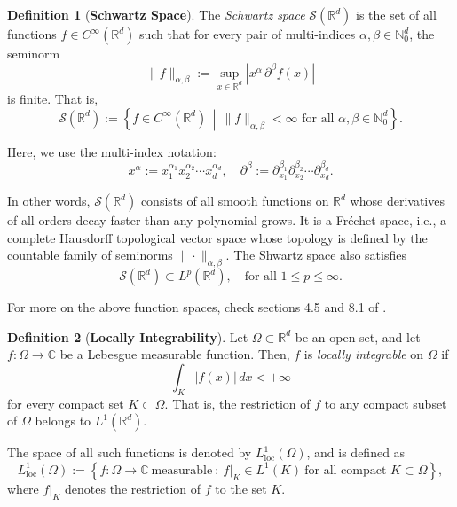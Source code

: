\documentclass[12pt,a4paper]{report}
\theoremstyle{definition}
\newtheorem{definition}{Definition}
\begin{document}
\begin{definition}[\textbf{Schwartz Space}] \label{def:schwartz}
The \textit{Schwartz space} \( \mathcal{S}(\mathbb{R}^d) \) is the set of all functions \( f \in C^\infty(\mathbb{R}^d) \) such that for every pair of multi-indices \( \alpha, \beta \in \mathbb{N}_0^d \), the seminorm
\[
\|f\|_{\alpha,\beta} := \sup_{x \in \mathbb{R}^d} |x^\alpha \, \partial^\beta f(x)|
\]
is finite. That is,
\[
\mathcal{S}(\mathbb{R}^d) := \left\{ f \in C^\infty(\mathbb{R}^d) \,\middle|\, \|f\|_{\alpha,\beta} < \infty \text{ for all } \alpha, \beta \in \mathbb{N}_0^d \right\}.
\]

Here, we use the multi-index notation:
\[
x^\alpha := x_1^{\alpha_1} x_2^{\alpha_2} \cdots x_d^{\alpha_d}, \quad \partial^\beta := \partial_{x_1}^{\beta_1} \partial_{x_2}^{\beta_2} \cdots \partial_{x_d}^{\beta_d}.
\]

In other words, \( \mathcal{S}(\mathbb{R}^d) \) consists of all smooth functions on \( \mathbb{R}^d \) whose derivatives of all orders decay faster than any polynomial grows. It is a Fréchet space, i.e., a complete Hausdorff topological vector space whose topology is defined by the countable family of seminorms \( \| \cdot \|_{\alpha, \beta} \). The Shwartz space also satisfies
\[
\mathcal{S}(\mathbb{R}^d) \subset L^p(\mathbb{R}^d), \quad \text{for all } 1 \le p \le \infty.
\]

For more on the above function spaces, check sections 4.5 and 8.1 of \cite{folland1999real}.
\end{definition}

\begin{definition}[\textbf{Locally Integrability}]
Let \( \Omega \subset \mathbb{R}^d \) be an open set, and let \\ \( f : \Omega \to \mathbb{C} \) be a Lebesgue measurable function. Then, \( f \) is \emph{locally integrable} on \( \Omega \) if
\[
\int_K |f(x)| \, dx < +\infty
\]
for every compact set \( K \subset \Omega \). That is, the restriction of \( f \) to any compact subset of \( \Omega \) belongs to \( L^1(\mathbb{R}^d) \).

The space of all such functions is denoted by \( L^1_{\mathrm{loc}}(\Omega) \), and is defined as
\[
L^1_{\mathrm{loc}}(\Omega) := \left\{ f : \Omega \to \mathbb{C} \ \text{measurable} \ :\ f|_K \in L^1(K) \ \text{for all compact } K \subset \Omega \right\},
\]
where \( f|_K \) denotes the restriction of \( f \) to the set \( K \).
\end{definition}
\end{document}
